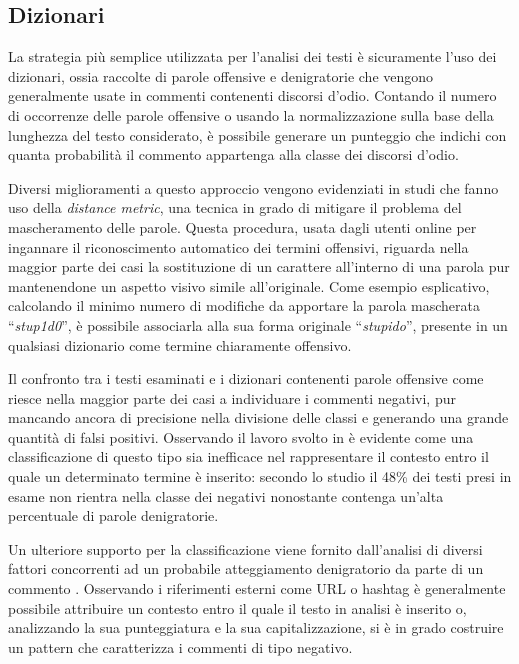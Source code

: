 \subsection{Dizionari}

La strategia più semplice utilizzata per l’analisi dei testi è sicuramente l’uso dei dizionari, ossia raccolte di parole offensive e denigratorie che vengono generalmente usate in commenti contenenti discorsi d’odio. Contando il numero di occorrenze delle parole offensive o usando la normalizzazione sulla base della lunghezza del testo considerato, è possibile generare un punteggio che indichi con quanta probabilità il commento appartenga alla classe dei discorsi d’odio.

Diversi miglioramenti a questo approccio vengono evidenziati in studi \cite{WilliamHate, languagedetect,SriCyberbullying} che fanno uso della \textit{distance metric}, una tecnica in grado di mitigare il problema del mascheramento delle parole. Questa procedura, usata dagli utenti online per ingannare il riconoscimento automatico dei termini offensivi, riguarda nella maggior parte dei casi la sostituzione di un carattere all’interno di una parola pur mantenendone un aspetto visivo simile all’originale. Come esempio esplicativo, calcolando il minimo numero di modifiche da apportare la parola mascherata “\textit{stup1d0}”, è possibile associarla alla sua forma originale “\textit{stupido}”, presente in un qualsiasi dizionario come termine chiaramente offensivo.

Il confronto tra i testi esaminati e i dizionari contenenti parole offensive come \cite{Hurtlex,ShuhuaDict,KarthikDict,MaralDict} riesce nella maggior parte dei casi a individuare i commenti negativi, pur mancando ancora di precisione nella divisione delle classi e generando una grande quantità di falsi positivi. Osservando il lavoro svolto in \cite{cyberbullying} è evidente come una classificazione di questo tipo sia inefficace nel rappresentare il contesto entro il quale un determinato termine è inserito: secondo lo studio il 48\% dei testi presi in esame non rientra nella classe dei negativi nonostante contenga un’alta percentuale di parole denigratorie.

Un ulteriore supporto per la classificazione viene fornito dall'analisi di diversi fattori concorrenti ad un probabile atteggiamento denigratorio da parte di un commento \cite{Chen,offensivelang}. Osservando i riferimenti esterni come URL o hashtag è generalmente possibile attribuire un contesto entro il quale il testo in analisi è inserito o, analizzando la sua punteggiatura e la sua capitalizzazione, si è in grado costruire un pattern che caratterizza i commenti di tipo negativo.

